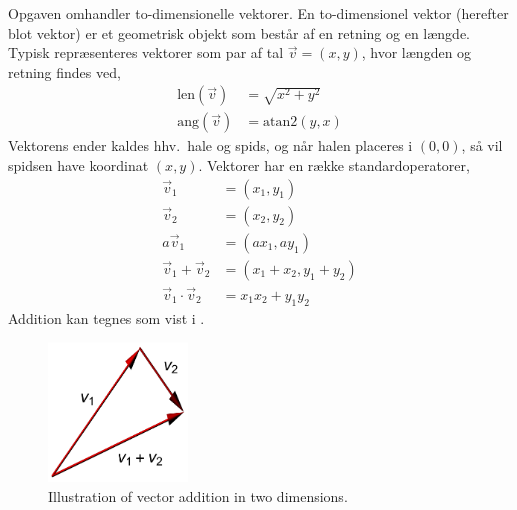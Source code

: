 Opgaven omhandler to-dimensionelle vektorer. En to-dimensionel vektor (herefter blot vektor) er et geometrisk objekt som består af en retning og en længde. Typisk repræsenteres vektorer som par af tal $\vec v  = (x, y)$, hvor længden og retning findes ved,
\begin{align}
  \text{len}(\vec v) &= \sqrt{x^2+y^2}
  \\\text{ang}(\vec v) &=\text{atan2}(y, x)
\end{align}
Vektorens ender kaldes hhv.\ hale og spids, og når halen placeres i $(0, 0)$, så vil spidsen have koordinat $(x, y)$. Vektorer har en række standardoperatorer,
\begin{align}
  \vec v_1 &= (x_1, y_1)
  \\\vec v_2 &= (x_2, y_2)
  \\a \vec v_1 &= (a x_1, a y_1)
  \\\vec v_1 + \vec v_2 &= (x_1+x_2, y_1+y_2)
  \\\vec v_1 \cdot \vec v_2 &= x_1 x_2 +  y_1y_2
\end{align}
Addition kan tegnes som vist i .
\begin{figure}
  \centering
  \includegraphics[width=0.33\textwidth]{vectorAddition}
  \caption{Illustration of vector addition in two dimensions.}
  \label{fig:vectorAddition}
\end{figure}
